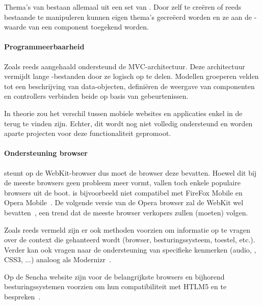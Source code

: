 Thema's van \st{} bestaan allemaal uit een set van .  
Door zelf  te creëren of reeds bestaande te manipuleren kunnen eigen thema's gecreëerd worden en ze aan de -waarde van een component toegekend worden.

\paragraph{Programmeerbaarheid}
\label{sec:sencha-programeerbaarheid}
Zoals reeds aangehaald ondersteund \st{} de MVC-architectuur.  
Deze architectuur vermijdt lange \js{}-bestanden door ze logisch op te delen.  
Modellen groeperen velden tot een beschrijving van data-objecten,  definiëren de weergave van componenten en controllers verbinden beide op basis van gebeurtenissen.

In theorie zou het verschil tussen mobiele websites en applicaties enkel in de  terug te vinden zijn.  
Echter,  dit wordt nog niet volledig ondersteund en worden aparte projecten voor deze functionaliteit gepromoot.

\paragraph{Ondersteuning browser}
\st{} steunt op de WebKit-browser  dus moet de browser deze bevatten.  
Hoewel dit bij de meeste browsers geen probleem meer vormt, vallen toch enkele populaire browsers uit de boot.  
\st{} is bijvoorbeeld niet compatibel met FireFox Mobile en Opera Mobile~\cite{JohnEClark2012}.
De volgende versie van de Opera browser zal de WebKit  wel bevatten~\cite{Wokke2013}, een trend dat de meeste browser verkopers zullen (moeten) volgen.

Zoals reeds vermeld zijn er ook methoden voorzien om informatie op te vragen over de context die gehanteerd wordt (browser, besturingssysteem, toestel, etc.).  
Verder kan \st{} ook vragen naar de ondersteuning van specifieke kenmerken (audio,  ,  CSS3, ...)  analoog als Modernizr~\cite{Modernizr2012}.  

Op de Sencha website zijn voor de belangrijkste browsers en bijhorend besturingssystemen  voorzien om hun compatibiliteit met HTLM5 en \st{} te bespreken~\cite{Inc.}.


